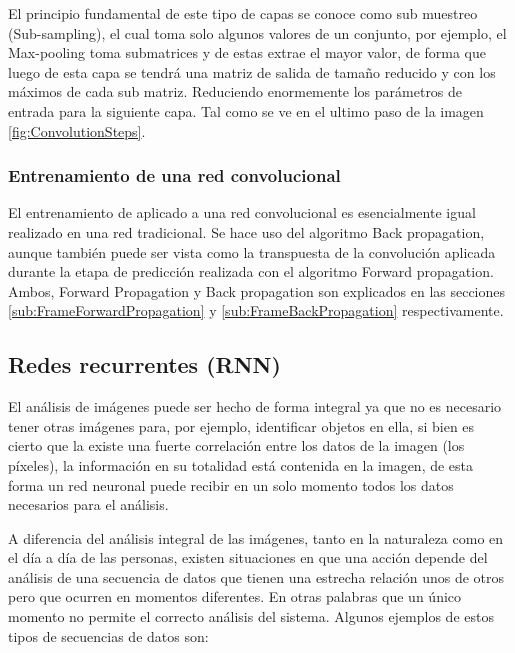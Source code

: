             El principio fundamental de este tipo de capas se conoce como sub muestreo (Sub-sampling), el cual toma solo algunos valores de un conjunto, por ejemplo, el Max-pooling toma submatrices y de estas extrae el mayor valor, de forma que luego de esta capa se tendrá una matriz de salida de tamaño reducido y con los máximos de cada sub matriz. Reduciendo enormemente los parámetros de entrada para la siguiente capa. Tal como se ve en el ultimo paso de la imagen \ref{fig:ConvolutionSteps}.

        \subsubsection{Entrenamiento de una red convolucional}
            El entrenamiento de aplicado a una red convolucional es esencialmente igual realizado en una red tradicional. Se hace uso del algoritmo Back propagation, aunque también puede ser vista como la transpuesta de la convolución aplicada durante la etapa de predicción realizada con el algoritmo Forward propagation. Ambos, Forward Propagation y Back propagation son explicados en las secciones \ref{sub:FrameForwardPropagation} y \ref{sub:FrameBackPropagation} respectivamente.
            
    \subsection{Redes recurrentes (RNN)}
    \label{sub:FrameRNN}
    
        El análisis de imágenes puede ser hecho de forma integral ya que no es necesario tener otras imágenes para, por ejemplo, identificar objetos en ella, si bien es cierto que la existe una fuerte correlación entre los datos de la imagen (los píxeles), la información en su totalidad está contenida en la imagen, de esta forma un red neuronal puede recibir en un solo momento todos los datos necesarios para el análisis.
        
        A diferencia del análisis integral de las imágenes, tanto en la naturaleza como en el día a día de las personas, existen situaciones en que una acción depende del análisis de una secuencia de datos que tienen una estrecha relación unos de otros pero que ocurren en momentos diferentes. En otras palabras que un único momento no permite el correcto análisis del sistema. Algunos ejemplos de estos tipos de secuencias de datos son:
        
